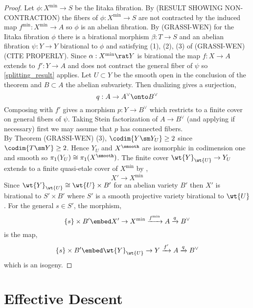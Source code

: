 \documentclass[12pt]{article}
\begin{document}
\begin{proof}
Let $\phi : X^{\min} \to S$ be the Iitaka fibration. By (RESULT SHOWING NON-CONTRACTION) the fibers of $\phi : X^{\min} \to S$ are not contracted by the induced map $f^{\min} : X^{\min} \to A$ so $\phi$ is an abelian fibration. By (GRASSI-WEN) for the Iitaka fibration $\phi$ there is a birational morphism $\beta : T \to S$ and an abelian fibration $\psi : Y \to Y$ birational to $\phi$ and satisfying (1), (2), (3) of (GRASSI-WEN)(CITE PROPERLY). Since $\alpha : X^{\min} \rat Y$ is birational the map $f : X \to A$ extends to $f' : Y \to A$ and does not contract the general fiber of $\psi$ so \ref{splitting_result} applies. Let $U \subset Y$ be the smooth open in the conclusion of the theorem and $B \subset A$ the abelian subvariety. Then dualizing gives a surjection,
\[ q : A \to A^\vee \onto B^\vee \]
Composing with $f'$ gives a morphism $p : Y \to B^\vee$ which restricts to a finite \etale cover on general fibers of $\psi$. Taking Stein factorization of $A \to B^\vee$ (and applying \cite[Theorem 4]{kawamata_abelian_varieties} if necessary) first we may assume that $p$ has connected fibers. 
\bigskip\\
By Theorem (GRASSI-WEN) (3), $\codim{Y \sm Y_U} \ge 2$ since $\codim{T \sm Y} \ge 2$. Hence $Y_U$ and $X^{\smooth}$ are isomorphic in codimension one and smooth so $\pi_1(Y_U) \cong \pi_1(X^{\smooth})$. The finite \etale cover $\wt{Y}_{\wt{U}} \to Y_U$ extends to a finite quasi-etale cover of $X^{\min}$ by \cite[Theorem 3.8]{GKP},
\[ X' \to X^{\min} \]
Since $\wt{Y}_{\wt{U}} \cong \wt{U} \times B'$ for an abelian variety $B'$ then $X'$ is birational to $S' \times B'$ where $S'$ is a smooth projective variety birational to $\wt{U}$. For the general $s \in S'$, the morphism,
\[ \{ s \} \times B' \embed X' \to X^{\min} \xrightarrow{f^{\min}} A \xrightarrow{q} B^\vee \]
is the map,
\[ \{ s \} \times B' \embed \wt{Y}_{\wt{U}} \to Y \xrightarrow{f'} A \xrightarrow{q} B^\vee \]
which is an isogeny. 
\end{proof}


\section{Effective Descent}
\end{document}
